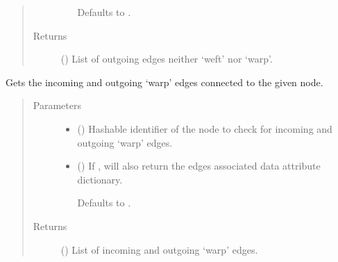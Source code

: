 \documentclass[letterpaper,10pt,english]{sphinxmanual}
\begin{document}
\begin{fulllineitems}
\begin{fulllineitems}
\begin{quote}
\begin{description}
\begin{itemize}
Defaults to .


\end{itemize}

\item[{Returns}] \leavevmode
{} () \textendash{} List of outgoing edges neither ‘weft’ nor ‘warp’.

\end{description}\end{quote}

\end{fulllineitems}


\begin{fulllineitems}
\label{\detokenize{cockatoo:cockatoo.KnitDiNetwork.node_warp_edges}}
Gets the incoming and outgoing ‘warp’ edges connected to the given node.
\begin{quote}\begin{description}
\item[{Parameters}] \leavevmode\begin{itemize}
\item {} 
 () \textendash{} Hashable identifier of the node to check for incoming and outgoing
‘warp’ edges.

\item {} 
 (\sphinxstyleliteralemphasis{\sphinxupquote{, }}) \textendash{} 
If , will also return the edges associated data attribute
dictionary.

Defaults to .


\end{itemize}

\item[{Returns}] \leavevmode
{} () \textendash{} List of incoming and outgoing ‘warp’ edges.


\end{description}
\end{quote}
\end{fulllineitems}
\end{fulllineitems}
\end{document}
